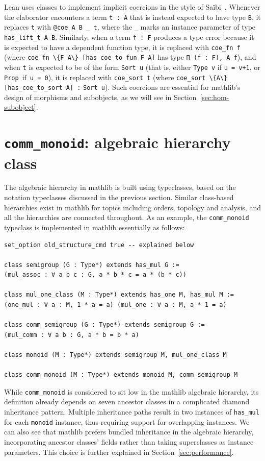\documentclass[a4paper,UKenglish,cleveref, autoref, thm-restate]{lipics-v2021}
\newcommand{\mathlib}{\textsf{mathlib}\xspace}
\begin{document}
Lean uses classes to implement implicit coercions in the style of Saïbi~\cite{Coq-Typing-With-Inheritance}.
Whenever the elaborator encounters a term \lstinline{t : A} that is instead expected to have type \lstinline{B},
it replaces \lstinline{t} with \lstinline{@coe A B _ t},
where the \lstinline{_} marks an instance parameter of type \lstinline{has_lift_t A B}.
Similarly, when a term \lstinline{f : F} produces a type error because it is expected to have a dependent function type,
it is replaced with \lstinline{coe_fn f} (where \mbox{\lstinline!coe_fn \{F A\} [has_coe_to_fun F A]!} has type \lstinline!Π (f : F), A f!),
and when \lstinline{t} is expected to be of the form \lstinline{Sort u} (that is, either \lstinline{Type v} if \lstinline{u = v+1}, or \mbox{\lstinline{Prop} if \lstinline{u = 0})}, it is replaced with \lstinline{coe_sort t}
(where \mbox{\lstinline!coe_sort \{A\} [has_coe_to_sort A] :!} \mbox{\lstinline!Sort u!}).
Such coercions are essential for \mathlib's design of morphisms and subobjects, as we will see in Section~\ref{sec:hom-subobject}.

\section{\lstinline{comm_monoid}: algebraic hierarchy class} \label{sec:monoid} \label{sec:alg-hierarchy}

The algebraic hierarchy in \mathlib is built using typeclasses,
based on the notation typeclasses discussed in the previous section.
Similar class-based hierarchies exist in \mathlib for topics including orders, topology and analysis,
and all the hierarchies are connected throughout.
As an example, the \lstinline{comm_monoid} typeclass is implemented in \mathlib essentially as follows:
\begin{lstlisting}
set_option old_structure_cmd true -- explained below

class semigroup (G : Type*) extends has_mul G :=
(mul_assoc : ∀ a b c : G, a * b * c = a * (b * c))

class mul_one_class (M : Type*) extends has_one M, has_mul M :=
(one_mul : ∀ a : M, 1 * a = a) (mul_one : ∀ a : M, a * 1 = a)

class comm_semigroup (G : Type*) extends semigroup G :=
(mul_comm : ∀ a b : G, a * b = b * a)

class monoid (M : Type*) extends semigroup M, mul_one_class M

class comm_monoid (M : Type*) extends monoid M, comm_semigroup M
\end{lstlisting}
While \lstinline{comm_monoid} is considered to sit low in the \mathlib algebraic hierarchy,
its definition already depends on seven ancestor classes in a complicated diamond inheritance pattern.
Multiple inheritance paths result in two instances of \lstinline{has_mul} for each \lstinline{monoid} instance, thus requiring support for overlapping instances.
We can also see that \mathlib prefers bundled inheritance in the algebraic hierarchy, incorporating ancestor classes' fields rather than taking superclasses as instance parameters.
This choice is further explained in Section~\ref{sec:performance}.
\end{document}

